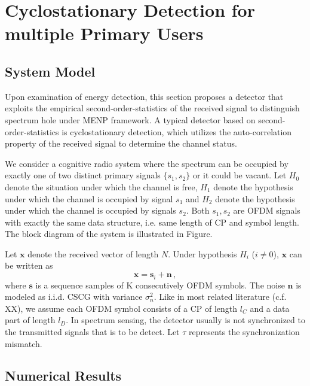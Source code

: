 \section{Cyclostationary Detection for multiple Primary Users}
\subsection{System Model}
Upon examination of energy detection, this section proposes a detector that exploits the empirical second-order-statistics of the received signal to distinguish spectrum hole under MENP framework. A typical detector based on second-order-statistics is cyclostationary detection, which  utilizes the auto-correlation property of the received signal to determine the channel status.  

We consider a cognitive radio system where the spectrum can be occupied by exactly one of two distinct primary signals $\{s_1, s_2\}$ or it could be vacant. Let $H_0$ denote the situation under which the channel is free, $H_1$ denote the hypothesis under which the channel is occupied by signal $s_1$ and $H_2$ denote the hypothesis under which the channel is occupied by signals $s_2$. Both $s_1, s_2$ are OFDM signals with exactly the same data structure, i.e. same length of CP and symbol length. The block diagram of the system is illustrated in Figure.

Let $\mathbf{x}$ denote the received vector of length $N$. Under hypothesis $H_i$ ($i \neq 0 $), $\mathbf{x}$ can be written as
\[
  \mathbf{x} = \mathbf{s}_i + \mathbf{n}\,,
\]
where $\mathbf{s}$ is a sequence samples of K consecutively OFDM symbols. The noise $\mathbf{n}$ is modeled as i.i.d. CSCG with variance $\sigma_n^2$.  Like in most related literature (c.f. XX),  we assume each OFDM symbol consists of a CP of length $l_C$ and a data part of length $l_D$. In spectrum sensing, the detector usually is not synchronized to the transmitted signals that is to be detect. Let $\tau$ represents the synchronization mismatch.  

\subsection{Numerical Results}

